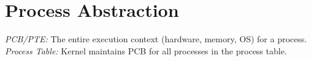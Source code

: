 \section{Process Abstraction}
\emph{PCB/PTE:} The entire execution context (hardware, memory, OS) for a process. \emph{Process Table:} Kernel maintains PCB for all processes in the process table.